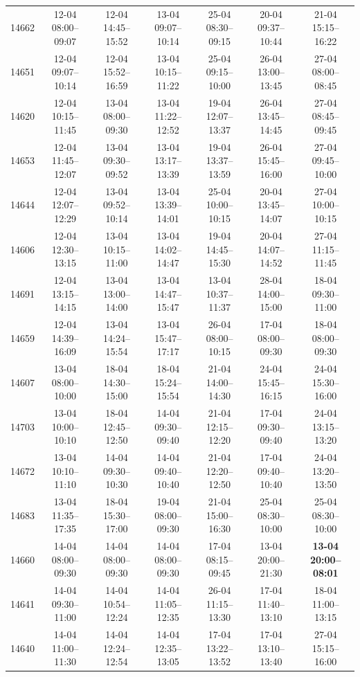 \begin{table}[htbp]
\begin{tabular}{|r|c|c|c|c|c|c|}
14662 & 12-04 08:00--09:07 & 12-04 14:45--15:52 & 13-04 09:07--10:14 & 25-04 08:30--09:15 & 20-04 09:37--10:44 & 21-04 15:15--16:22 \\ 
14651 & 12-04 09:07--10:14 & 12-04 15:52--16:59 & 13-04 10:15--11:22 & 25-04 09:15--10:00 & 26-04 13:00--13:45 & 27-04 08:00--08:45 \\ 
14620 & 12-04 10:15--11:45 & 13-04 08:00--09:30 & 13-04 11:22--12:52 & 19-04 12:07--13:37 & 26-04 13:45--14:45 & 27-04 08:45--09:45 \\ 
14653 & 12-04 11:45--12:07 & 13-04 09:30--09:52 & 13-04 13:17--13:39 & 19-04 13:37--13:59 & 26-04 15:45--16:00 & 27-04 09:45--10:00 \\ 
14644 & 12-04 12:07--12:29 & 13-04 09:52--10:14 & 13-04 13:39--14:01 & 25-04 10:00--10:15 & 20-04 13:45--14:07 & 27-04 10:00--10:15 \\ 
14606 & 12-04 12:30--13:15 & 13-04 10:15--11:00 & 13-04 14:02--14:47 & 19-04 14:45--15:30 & 20-04 14:07--14:52 & 27-04 11:15--11:45 \\ 
14691 & 12-04 13:15--14:15 & 13-04 13:00--14:00 & 13-04 14:47--15:47 & 13-04 10:37--11:37 & 28-04 14:00--15:00 & 18-04 09:30--11:00 \\ 
14659 & 12-04 14:39--16:09 & 13-04 14:24--15:54 & 13-04 15:47--17:17 & 26-04 08:00--10:15 & 17-04 08:00--09:30 & 18-04 08:00--09:30 \\ 
14607 & 13-04 08:00--10:00 & 18-04 14:30--15:00 & 18-04 15:24--15:54 & 21-04 14:00--14:30 & 24-04 15:45--16:15 & 24-04 15:30--16:00 \\ 
14703 & 13-04 10:00--10:10 & 18-04 12:45--12:50 & 14-04 09:30--09:40 & 21-04 12:15--12:20 & 17-04 09:30--09:40 & 24-04 13:15--13:20 \\ 
14672 & 13-04 10:10--11:10 & 14-04 09:30--10:30 & 14-04 09:40--10:40 & 21-04 12:20--12:50 & 17-04 09:40--10:40 & 24-04 13:20--13:50 \\ 
14683 & 13-04 11:35--17:35 & 18-04 15:30--17:00 & 19-04 08:00--09:30 & 21-04 15:00--16:30 & 25-04 08:30--10:00 & 25-04 08:30--10:00 \\ 
14660 & 14-04 08:00--09:30 & 14-04 08:00--09:30 & 14-04 08:00--09:30 & 17-04 08:15--09:45 & 13-04 20:00--21:30 & \textbf{13-04 20:00--08:01} \\ 
14641 & 14-04 09:30--11:00 & 14-04 10:54--12:24 & 14-04 11:05--12:35 & 26-04 11:15--13:30 & 17-04 11:40--13:10 & 18-04 11:00--13:15 \\ 
14640 & 14-04 11:00--11:30 & 14-04 12:24--12:54 & 14-04 12:35--13:05 & 17-04 13:22--13:52 & 17-04 13:10--13:40 & 27-04 15:15--16:00 \\ 

\end{tabular}
\end{table}
